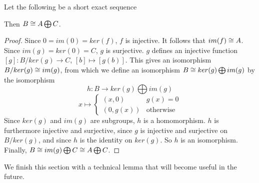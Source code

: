 \begin{proposition}\label{short-seq-direct-sum}
Let the following be a short exact sequence
Then $B\cong A\bigoplus C$.
\end{proposition}

\begin{proof}
Since $0=im(0)=ker(f)$, $f$ is injective. It follows that $im(f)\cong A$. Since $im(g)=ker(0)=C$, $g$ is surjective. $g$ defines an injective function $[g]:B/ker(g)\rightarrow C$, $[b]\mapsto [g(b)]$. This gives an isomorphism $B/ker(g)\cong im(g)$, from which we define an isomorphism $B\cong ker(g)\bigoplus im(g)$ by the isomorphism $$h:B\rightarrow ker(g)\bigoplus im(g)$$
$$x\mapsto \begin{cases}(x,0) & g(x)=0\\ (0,g(x)) & \text{otherwise}\end{cases}$$
Since $ker(g)$ and $im(g)$ are subgroups, $h$ is a homomorphism. $h$ is furthermore injective and surjective, since $g$ is injective and surjective on $B/ker(g)$, and since $h$ is the identity on $ker(g)$. So $h$ is an isomorphism. Finally, $B\cong im(g)\bigoplus C\cong A\bigoplus C$.
\end{proof}

We finish this section with a technical lemma that will become useful in the future.


